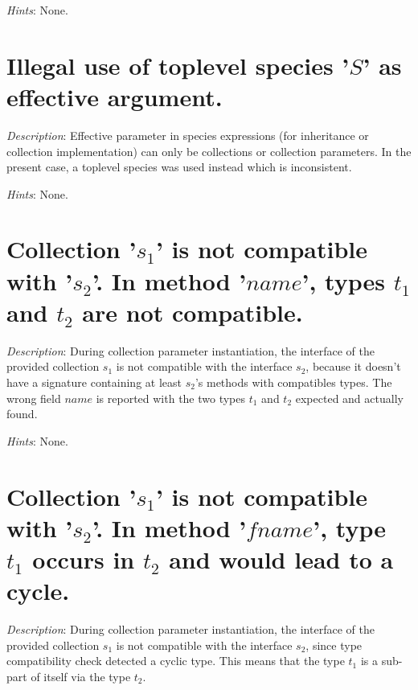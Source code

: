{\em Hints}: None.



\section*{Illegal use of toplevel species '$S$' as effective argument.}

{\em Description}: Effective parameter in species expressions (for inheritance
or collection implementation) can only be collections or collection
parameters. In the present case, a toplevel species was used instead which
is inconsistent.

{\em Hints}: None.



\section*{Collection '$s_1$' is not compatible with '$s_2$'. In method
  '$name$', types $t_1$ and $t_2$ are not compatible.}

{\em Description}: During collection parameter instantiation, the
interface of the provided collection  $s_1$ is not compatible with the
interface  $s_2$, because it doesn't have a signature containing at
least $s_2$'s methods with compatibles types. The wrong field $name$
is reported with the two types $t_1$ and $t_2$ expected and actually
found.

{\em Hints}: None.



\section*{Collection '$s_1$' is not compatible with '$s_2$'. In method
  '$fname$', type $t_1$ occurs in $t_2$ and would lead to a cycle.}

{\em Description}: During collection parameter instantiation, the interface
of the provided collection $s_1$ is not compatible with the interface $s_2$,
since type compatibility check detected a cyclic type. This means that the
type $t_1$ is a sub-part of itself via the type $t_2$.

